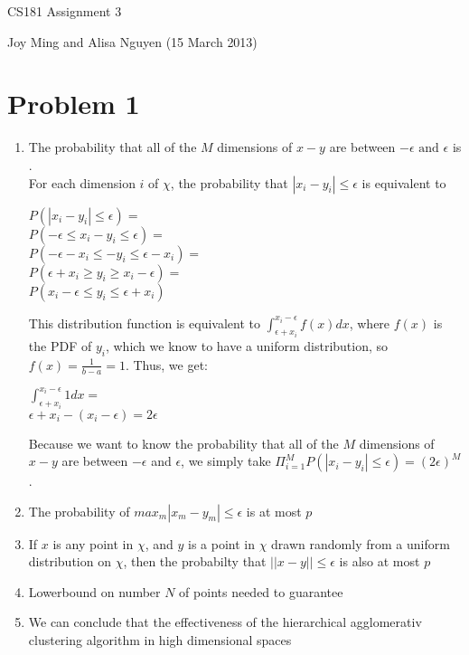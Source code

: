 \documentclass[11pt]{article}
\begin{document}
\begin{center}
\large
CS181 Assignment 3
\end{center}
Joy Ming and Alisa Nguyen (15 March 2013)\\

\section{Problem 1}
\begin{enumerate}
\item The probability that all of the $M$ dimensions of $x - y$ are between $-\epsilon \text{ and } \epsilon$ is .
\\ For each dimension $i$ of $\chi$, the probability that $|x_i - y_i| \leq \epsilon$ is equivalent to 
\begin{center}
$P(|x_i - y_i| \leq \epsilon) = $ \\
$P(- \epsilon \leq x_i - y_i \leq \epsilon) = $ \\
$P(- \epsilon - x_i \leq - y_i \leq \epsilon - x_i) = $ \\
$P(\epsilon + x_i \geq y_i \geq x_i - \epsilon) = $ \\
$P(x_i - \epsilon \leq y_i \leq \epsilon + x_i)$
\end{center}
This distribution function is equivalent to $\int_{\epsilon + x_i}^{x_i - \epsilon} f(x)dx$, where $f(x)$ is the PDF of $y_i$, which we know to have a uniform distribution, so $f(x) = \frac{1}{b - a} = 1$. Thus, we get:
\begin{center}
$\int_{\epsilon + x_i}^{x_i - \epsilon} 1 dx = $ \\
$\epsilon + x_i - (x_i - \epsilon) = 2\epsilon$
\end{center} 
Because we want to know the probability that all of the $M$ dimensions of $x - y$ are between $-\epsilon$ and $\epsilon$, we simply take $\Pi_{i = 1}^{M} P(|x_i - y_i| \leq \epsilon) = (2\epsilon)^M$.
\item The probability of $max_m |x_m - y_m| \leq \epsilon$ is at most $p$
\item If $x$ is any point in $\chi$, and $y$ is a point in $\chi$ drawn randomly from a uniform distribution on $\chi$, then the probabilty that $||x - y|| \leq \epsilon$ is also at most $p$
\item Lowerbound on number $N$ of points needed to guarantee
\item We can conclude that the effectiveness of the hierarchical agglomerativ clustering algorithm in high dimensional spaces
\end{enumerate}
\end{document}
